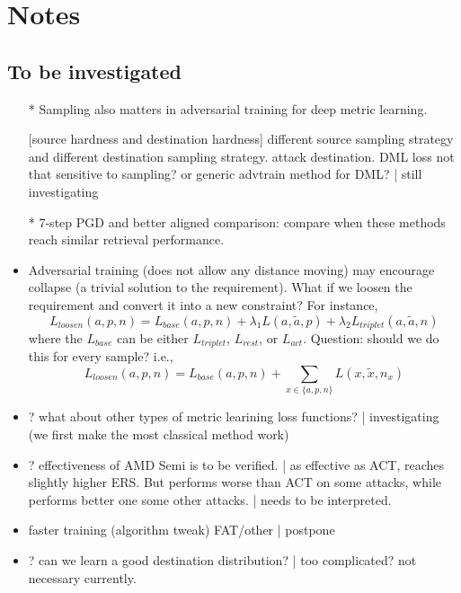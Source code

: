 \appendix

\section{Notes}

\subsection{To be investigated}

\begin{itemize}

	\item [*]
		Sampling also matters in adversarial training for deep metric learning.

		[source hardness and destination hardness] different source sampling
		strategy and different destination sampling strategy. attack
		destination. DML loss not that sensitive to sampling? or generic
		advtrain method for DML? | still investigating

	\item [*] 7-step PGD and better aligned comparison: compare when
		these methods reach similar retrieval performance.

	\item Adversarial training (does not allow any distance moving) may
		encourage collapse (a trivial solution to the requirement). What if we
		loosen the requirement and convert it into a new constraint? For
		instance, \[
			L_{loosen}(a,p,n)=L_{base}(a,p,n)+\lambda_{1}L(a,\tilde{a},p)+\lambda_{2}L_{triplet}(a,\tilde{a},n)
		\] where the $L_{base}$ can be either $L_{triplet}$, $L_{rest}$, or
		$L_{act}$. Question: should we do this for every sample? i.e., \[
			L_{loosen}(a,p,n)=L_{base}(a,p,n)+\sum_{x\in\{a,p,n\}}L(x,\tilde{x},n_{x})
		\]

	\item ?  what about other types of metric learining loss functions? |
		investigating (we first make the most classical method work)

	\item ?  effectiveness of AMD Semi is to be verified. | as effective
		as ACT, reaches slightly higher ERS. But performs worse than ACT on
		some attacks, while performs better one some other attacks. | needs to
		be interpreted.

	\item faster training (algorithm tweak) FAT/other | postpone

	\item ? can we learn a good destination distribution? | too
		complicated? not necessary currently.


\end{itemize}
